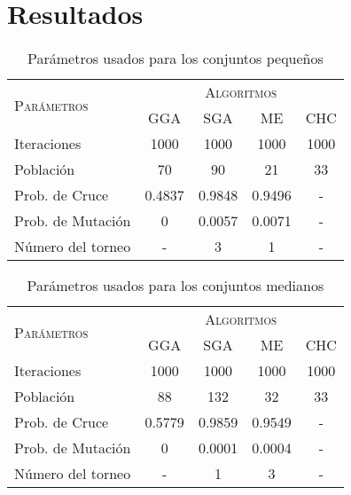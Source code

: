 \chapter{Resultados}
\label{capitulo3}

\begin{table}[]
\centering
\begin{tabular}{l c c c c}
\hline
\multirow{2}{*}{\textsc{Parámetros}}
	& \multicolumn{4}{c}{\textsc{Algoritmos}} \\
	& GGA & SGA & ME & CHC \\
\hline
\hline
Iteraciones        &  1000    &  1000    &  1000      &  1000 \\
Población          &    70    &    90    &    21      &    33 \\
Prob. de Cruce     &   0.4837 &   0.9848 &     0.9496 &     - \\
Prob. de Mutación  &   0      &  0.0057  &     0.0071 &     - \\
Número del torneo  &   -      &    3     &     1      &     - \\
\hline
\end{tabular}
\caption{Parámetros usados para los conjuntos pequeños}
\label{param-peq}
\end{table}


\begin{table}[]
\centering
\begin{tabular}{l c c c c}
\hline
\multirow{2}{*}{\textsc{Parámetros}}
	& \multicolumn{4}{c}{\textsc{Algoritmos}} \\
	& GGA & SGA & ME & CHC \\
\hline
\hline
Iteraciones        &  1000    &  1000    &  1000      &  1000 \\
Población          &    88    &    132   &    32      &    33 \\
Prob. de Cruce     &   0.5779 &   0.9859 &     0.9549 &     - \\
Prob. de Mutación  &   0      &  0.0001  &     0.0004 &     - \\
Número del torneo  &   -      &    1     &     3      &     - \\
\hline
\end{tabular}
\caption{Parámetros usados para los conjuntos medianos}
\label{param-med}
\end{table}